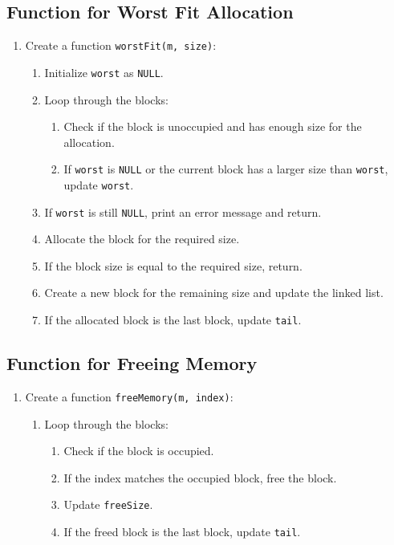 {  \subsection{Function for Worst Fit Allocation}
  \begin{enumerate}[label=\arabic*.,left=0pt]
    \item Create a function \texttt{worstFit(m, size)}:
          \begin{enumerate}[label=2.\arabic*.,left=0pt]
            \item Initialize \texttt{worst} as \texttt{NULL}.
            \item Loop through the blocks:
                  \begin{enumerate}[label=2.2.\arabic*.,left=0pt]
                    \item Check if the block is unoccupied and has enough size for the allocation.
                    \item If \texttt{worst} is \texttt{NULL} or the current block has a larger size than \texttt{worst}, update \texttt{worst}.
                  \end{enumerate}
            \item If \texttt{worst} is still \texttt{NULL}, print an error message and return.
            \item Allocate the block for the required size.
            \item If the block size is equal to the required size, return.
            \item Create a new block for the remaining size and update the linked list.
            \item If the allocated block is the last block, update \texttt{tail}.
          \end{enumerate}
  \end{enumerate}

  \subsection{Function for Freeing Memory}
  \begin{enumerate}[label=\arabic*.,left=0pt]
    \item Create a function \texttt{freeMemory(m, index)}:
          \begin{enumerate}[label=2.\arabic*.,left=0pt]
            \item Loop through the blocks:
                  \begin{enumerate}[label=2.2.\arabic*.,left=0pt]
                    \item Check if the block is occupied.
                    \item If the index matches the occupied block, free the block.
                    \item Update \texttt{freeSize}.
                    \item If the freed block is the last block, update \texttt{tail}.
                  \end{enumerate}
          \end{enumerate}
  \end{enumerate}

}
